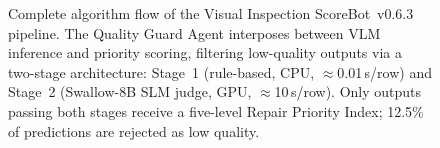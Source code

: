 \documentclass[twocolumn]{article}
\begin{document}
\begin{figure}[t]
\caption{Complete algorithm flow of the Visual Inspection ScoreBot~v0.6.3
pipeline.
The Quality Guard Agent interposes between VLM inference and priority
scoring, filtering low-quality outputs via a two-stage architecture:
Stage~1 (rule-based, CPU, $\approx$0.01\,s/row) and Stage~2
(Swallow-8B SLM judge, GPU, $\approx$10\,s/row).
Only outputs passing both stages receive a five-level Repair Priority
Index; 12.5\% of predictions are rejected as low quality.}
\label{fig:algorithm_flow}
\end{figure}
\end{document}
